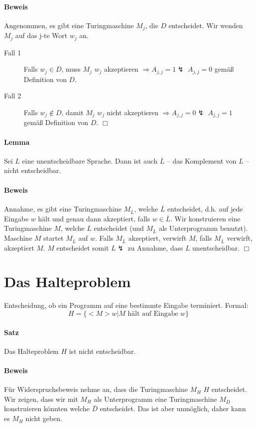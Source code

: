\paragraph*{Beweis} Angenommen, es gibt eine Turingmaschine $M_j$, die $D$ entscheidet. Wir wenden $M_j$ auf das j-te Wort $w_j$ an.
\begin{description}
	\item[Fall 1] Falls $w_j \in D$, muss $M_j$ $w_j$ akzeptieren $\Rightarrow A_{j,j}=1 \lightning$ $A_{j,j}=0$ gemäß Definition von $D$.
	\item[Fall 2] Falls $w_j \not\in D$, damit $M_j$ $w_j$ nicht akzeptieren $\Rightarrow A_{j,j}=0 \lightning$ $A_{j,j}=1$ gemäß Definition von $D$. $\Box$
\end{description}

\paragraph*{Lemma} Sei $L$ eine unentscheidbare Sprache. Dann ist auch $\overline{L}$ -- das Komplement von $L$ -- nicht entscheidbar.

\paragraph*{Beweis} Annahme, es gibt eine Turingmaschine $M_{\overline{L}}$, welche $\overline{L}$ entscheidet, d.h. auf jede Eingabe $w$ hält und genau dann akzeptiert, falls $w \in \overline{L}$. Wir konstruieren eine Turingmaschine $M$, welche $L$ entscheidet (und $M_{\overline{L}}$ als Unterprogramm benutzt). Maschine $M$ startet $M_{\overline{L}}$ auf $w$. Falls $M_{\overline{L}}$ akzeptiert, verwirft $M$, falls $M_{\overline{L}}$ verwirft, akzeptiert $M$. $M$ entscheidet somit $L \lightning$ zu Annahme, dass $L$ unentscheidbar. $\Box$


\section{Das Halteproblem}
Entscheidung, ob ein Programm auf eine bestimmte Eingabe terminiert. Formal: $$ H=\{ <M>w|M \text{ hält auf Eingabe } w \} $$

\paragraph*{Satz} Das Halteproblem $H$ ist nicht entscheidbar.

\paragraph*{Beweis} Für Widerspruchsbeweis nehme an, dass die Turingmaschine $M_H$ $H$ entscheidet. Wir zeigen, dass wir mit $M_H$ als Unterprogramm eine Turingmaschine $M_{\overline{D}}$ konstruieren könnten welche $\overline{D}$ entscheidet. Das ist aber unmöglich, daher kann es $M_H$ nicht geben.

